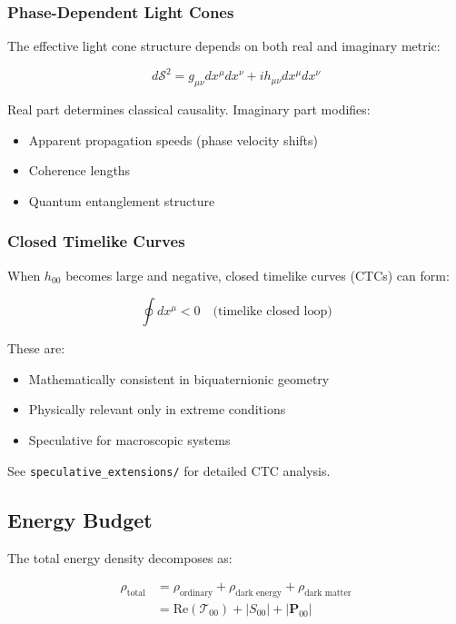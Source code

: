\subsubsection{Phase-Dependent Light Cones}

The effective light cone structure depends on both real and imaginary metric:

\begin{equation}
d\mathcal{S}^2 = g_{\mu\nu} dx^\mu dx^\nu + i h_{\mu\nu} dx^\mu dx^\nu
\end{equation}

Real part determines classical causality. Imaginary part modifies:
\begin{itemize}
    \item Apparent propagation speeds (phase velocity shifts)
    \item Coherence lengths
    \item Quantum entanglement structure
\end{itemize}

\subsubsection{Closed Timelike Curves}

When $h_{00}$ becomes large and negative, closed timelike curves (CTCs) can form:

\begin{equation}
\oint dx^\mu < 0 \quad \text{(timelike closed loop)}
\end{equation}

These are:
\begin{itemize}
    \item Mathematically consistent in biquaternionic geometry
    \item Physically relevant only in extreme conditions
    \item Speculative for macroscopic systems
\end{itemize}

See \texttt{speculative\_extensions/} for detailed CTC analysis.

\subsection{Energy Budget}

The total energy density decomposes as:

\begin{align}
\rho_{\text{total}} &= \rho_{\text{ordinary}} + \rho_{\text{dark energy}} + \rho_{\text{dark matter}} \\
&= \text{Re}(\mathcal{T}_{00}) + |S_{00}| + |\mathbf{P}_{00}|
\end{align}

